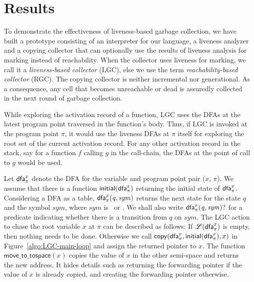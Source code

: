 \documentclass[9pt]{sigplanconf}
\begin{document}
\section{Results}
To demonstrate the effectiveness of liveness-based garbage collection,
we  have  built a  prototype  consisting  of  an interpreter  for  our
language,  a  liveness  analyzer  and  a copying  collector  that  can
optionally use the results of liveness analysis for marking instead of
reachability. When the collector uses liveness for marking, we call it
a  {\em liveness-based  collector} (LGC),  else we  use the  term {\em
  reachability-based  collector}  (RGC).   The  copying  collector  is
neither incremental nor generational.  As a consequence, any cell that
becomes unreachable or  dead is assuredly collected in  the next round
of garbage collection.

While exploring the activation record of a function, LGC uses the DFAs
at  the latest  program  point traversed  in the function's body.
Thus, if  LGC
is invoked  at the program point   $\pi$,  it would  use  the
liveness  DFAs at  $\pi$ itself for exploring the root set of the
current activation record. For any other activation record in the
stack, say for a function ${\mathit f}$ calling ${\mathit g}$ in the
call-chain,
the DFAs at the point of call to  ${\mathit g}$ would be used.



Let $\mathsf{dfa}_{{\pi}}^{x}$  denote the DFA  for the variable  and program
point  pair ($x$,  $\pi$).  We  assume that  there is  a function
$\mathsf{initial}(\mathsf{dfa}_{{\pi}}^{x})$  returning the initial  state of
$\mathsf{dfa}_{{\pi}}^{x}$.
Considering   a   DFA   as   a   table,
$\mathsf{dfa}_{{\pi}}^{x}\mathit{(q,sym)}$  returns the  next  state for  the
state $q$ and the  symbol $\mathit{sym}$, where $\mathit{sym}$ is
\acar\      or     \acdr.       We      shall     also      write
$\mathsf{dfa}_{{\pi}}^{x}\mathit{(q,sym)\mathsf{?}}$    for    a    predicate
indicating  whether there  is a  transition from  $q$ on
$\mathit{sym}$.  The LGC action to chase the root variable $x$ at
$\pi$ can be described as  follows: If $\mathscr{L}(\mathsf{dfa}_{{\pi}}^{x})$ is
empty,  then  nothing  needs  to  be  done.   Otherwise  we  call
$\mathsf{copy}(\mathsf{dfa}_{{\pi}}^{x},\mathsf{initial}(\mathsf{dfa}_{{\pi}}^{x}),    x)$
in   Figure~\ref{algo:LGC-main-loop}  and  assign   the  returned
pointer to $x$.
The function $\mathsf{move\_to\_tospace}(x)$  copies the value of
$x$  in the  other semi-space  and returns  the new  address.  It
hides  details such as  returning the  forwarding pointer  if the
value  of $x$  is  already copied,  and  creating the  forwarding
pointer otherwise.
\end{document}
